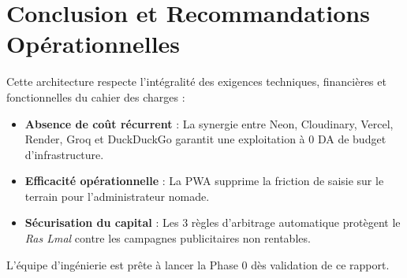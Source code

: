 \documentclass[11pt,a4paper]{article}
\begin{document}
\section{Conclusion et Recommandations Opérationnelles}
Cette architecture respecte l'intégralité des exigences techniques, financières et fonctionnelles du cahier des charges :
\begin{itemize}[leftmargin=*]
    \item \textbf{Absence de coût récurrent} : La synergie entre Neon, Cloudinary, Vercel, Render, Groq et DuckDuckGo garantit une exploitation à 0 DA de budget d'infrastructure.
    \item \textbf{Efficacité opérationnelle} : La PWA supprime la friction de saisie sur le terrain pour l'administrateur nomade.
    \item \textbf{Sécurisation du capital} : Les 3 règles d'arbitrage automatique protègent le \textit{Ras Lmal} contre les campagnes publicitaires non rentables.
\end{itemize}

L'équipe d'ingénierie est prête à lancer la Phase 0 dès validation de ce rapport.
\end{document}
